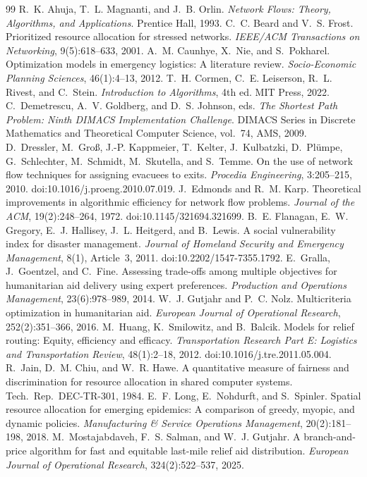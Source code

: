 \documentclass[11pt]{article}
\begin{document}
\begin{thebibliography}{99}
 R.~K. Ahuja, T.~L. Magnanti, and J.~B. Orlin.
  \emph{Network Flows: Theory, Algorithms, and Applications}.
  Prentice Hall, 1993.
 C.~C. Beard and V.~S. Frost.
  Prioritized resource allocation for stressed networks.
  \emph{IEEE/ACM Transactions on Networking}, 9(5):618--633, 2001.
 A.~M. Caunhye, X.~Nie, and S.~Pokharel.
  Optimization models in emergency logistics: A literature review.
  \emph{Socio-Economic Planning Sciences}, 46(1):4--13, 2012.
 T.~H. Cormen, C.~E. Leiserson, R.~L. Rivest, and C.~Stein.
  \emph{Introduction to Algorithms}, 4th ed. MIT Press, 2022.
 C.~Demetrescu, A.~V. Goldberg, and D.~S. Johnson, eds.
  \emph{The Shortest Path Problem: Ninth DIMACS Implementation Challenge}.
  DIMACS Series in Discrete Mathematics and Theoretical Computer Science,
  vol.~74, AMS, 2009.
 D.~Dressler, M.~Gro\ss, J.-P. Kappmeier, T.~Kelter,
  J.~Kulbatzki, D.~Pl\"umpe, G.~Schlechter, M.~Schmidt, M.~Skutella, and
  S.~Temme.
  On the use of network flow techniques for assigning evacuees to exits.
  \emph{Procedia Engineering}, 3:205--215, 2010.
  doi:10.1016/j.proeng.2010.07.019.
 J.~Edmonds and R.~M. Karp.
  Theoretical improvements in algorithmic efficiency for network flow problems.
  \emph{Journal of the ACM}, 19(2):248--264, 1972.
  doi:10.1145/321694.321699.
 B.~E. Flanagan, E.~W. Gregory, E.~J. Hallisey,
  J.~L. Heitgerd, and B.~Lewis.
  A social vulnerability index for disaster management.
  \emph{Journal of Homeland Security and Emergency Management}, 8(1),
  Article~3, 2011. doi:10.2202/1547-7355.1792.
 E.~Gralla, J.~Goentzel, and C.~Fine.
  Assessing trade-offs among multiple objectives for humanitarian aid
  delivery using expert preferences.
  \emph{Production and Operations Management}, 23(6):978--989, 2014.
 W.~J. Gutjahr and P.~C. Nolz.
  Multicriteria optimization in humanitarian aid.
  \emph{European Journal of Operational Research}, 252(2):351--366, 2016.
 M.~Huang, K.~Smilowitz, and B.~Balcik.
  Models for relief routing: Equity, efficiency and efficacy.
  \emph{Transportation Research Part E: Logistics and Transportation
  Review}, 48(1):2--18, 2012. doi:10.1016/j.tre.2011.05.004.
 R.~Jain, D.~M. Chiu, and W.~R. Hawe.
  A quantitative measure of fairness and discrimination for resource
  allocation in shared computer systems. Tech.\ Rep.\ DEC-TR-301, 1984.
 E.~F. Long, E.~Nohdurft, and S.~Spinler.
  Spatial resource allocation for emerging epidemics: A comparison of
  greedy, myopic, and dynamic policies.
  \emph{Manufacturing \& Service Operations Management}, 20(2):181--198,
  2018.
 M.~Mostajabdaveh, F.~S. Salman, and W.~J. Gutjahr.
  A branch-and-price algorithm for fast and equitable last-mile relief aid
  distribution. \emph{European Journal of Operational Research},
  324(2):522--537, 2025.
\end{thebibliography}
\end{document}
